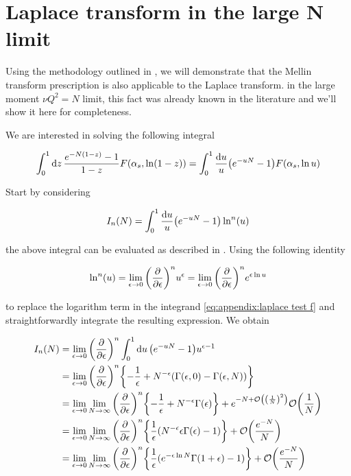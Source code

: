\documentclass[../main.tex]{subfiles}
\begin{document}
\chapter{Laplace transform in the large N limit} \label{Appendix: Laplace and Mellin transform}

Using the methodology outlined in \cite{Catani_2003_appendix}, we will demonstrate that the Mellin transform prescription is also applicable to the Laplace transform.
in the large moment $\nu Q^2 = N$ limit, this fact was already known in the literature \cite{CATAN_large_chi} and we'll show it here for completeness.

We are interested in solving the following integral

\begin{equation}
    \int_0^1 \dd{z} \frac{e^{- N (1-z)} - 1}{1-z} F\qty(\alpha_s,\ln(1-z))= \int_0^1 \frac{\dd{u}}{u} \qty(e^{-u N} - 1) F\qty(\alpha_s , \ln u)
\end{equation}

Start by considering 

\begin{equation}\label{eq:appendix:laplace test f}
    I_n(N) = \int_0^1 \frac{\dd{u}}{u} \qty(e^{-u N} - 1) \ln^n(u) 
\end{equation}

the above integral can be evaluated as described in \cite{CATANI1989323}. Using the following identity

\begin{equation}
    \ln^n(u)= \lim_{\epsilon \to 0} \qty(\pdv{\epsilon})^n u^\epsilon = \lim_{\epsilon \to 0} \qty(\pdv{\epsilon})^n e^{\epsilon \ln u}
\end{equation}

to replace the logarithm term in the integrand \cref{eq:appendix:laplace test f} and straightforwardly integrate the resulting expression. We obtain

\begin{align}
    \begin{split}\label{eq:appendix:calculation}
    I_n(N) &= \lim_{\epsilon \to 0} \qty(\pdv{\epsilon})^n \int_0^1 \dd{u} \qty(e^{-u N} - 1) u^{\epsilon-1} \\
    &= \lim_{\epsilon \to 0} \qty(\pdv{\epsilon})^n \qty{-\frac{1}{\epsilon}+N^{-\epsilon} (\Gamma(\epsilon,0) - \Gamma(\epsilon,N))} \\
    &= \lim_{\epsilon \to 0} \lim_{N \to \infty} \qty(\pdv{\epsilon})^n \qty{-\frac{1}{\epsilon}+N^{-\epsilon} \Gamma(\epsilon)}+ e^{-N + \order{\qty(\frac{1}{N})^2}}\order{\frac{1}{N}} \\
    &= \lim_{\epsilon \to 0} \lim_{N \to \infty} \qty(\pdv{\epsilon})^n \qty{\frac{1}{\epsilon} (N^{-\epsilon} \epsilon \Gamma(\epsilon) -1)} + \order{\frac{e^{-N}}{N}}\\
    &= \lim_{\epsilon \to 0} \lim_{N \to \infty} \qty(\pdv{\epsilon})^n \qty{\frac{1}{\epsilon} ( e^{-\epsilon \ln N} \Gamma(1+\epsilon) -1)} + \order{\frac{e^{-N}}{N}}
    \end{split}
\end{align}
\end{document}
